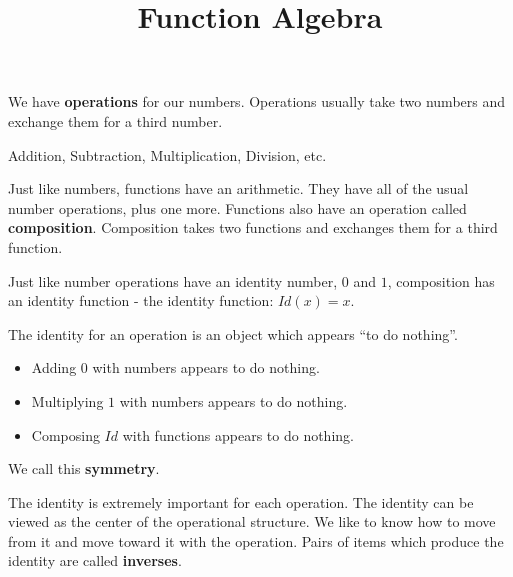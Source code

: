 \documentclass{ximera}
\title{Function Algebra}
\begin{document}
\begin{abstract}

\end{abstract}
\maketitle
















We have \textbf{operations} for our numbers.  Operations usually take two numbers and exchange them for a third number.

\begin{center}
Addition, Subtraction, Multiplication, Division, etc.
\end{center}



Just like numbers, functions have an arithmetic.  They have all of the usual number operations, plus one more.  Functions also have an operation called \textbf{\textcolor{purple!85!blue}{composition}}.  Composition takes two functions and exchanges them for a third function.

Just like number operations have an identity number, $0$ and $1$, composition has an identity function - the identity function: $Id(x) = x$.


The identity for an operation is an object which appears ``to do nothing''.  


\begin{itemize}
\item Adding $0$ with numbers appears to do nothing.
\item Multiplying $1$ with numbers appears to do nothing.
\item Composing $Id$ with functions appears to do nothing.
\end{itemize}




We call this \textbf{symmetry}.



The identity is extremely important for each operation.  The identity can be viewed as the center of the operational structure.  We like to know how to move from it and move toward it with the operation.  Pairs of items which produce the identity are called \textbf{\textcolor{purple!85!blue}{inverses}}.
\end{document}
